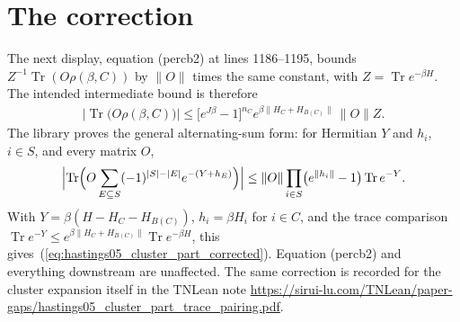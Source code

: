\documentclass{article}
\begin{document}
\section{The correction}
The next display, equation (percb2) at lines 1186--1195, bounds
$Z^{-1}\operatorname{Tr}(O\rho(\beta,C))$ by $\|O\|$ times the same constant,
with $Z=\operatorname{Tr}e^{-\beta H}$. The intended intermediate bound is
therefore
\begin{align}
 \bigl|\operatorname{Tr}\bigl(O\rho(\beta,C)\bigr)\bigr|
 \le\bigl[e^{J\beta}-1\bigr]^{n_C}e^{\beta\|H_C+H_{B(C)}\|}\,\|O\|Z.
 \label{eq:hastings05_cluster_part_corrected}
\end{align}
The library proves the general alternating-sum form: for Hermitian $Y$ and
$h_i$, $i\in S$, and every matrix $O$,
\begin{align*}
 \Bigl|\operatorname{Tr}\Bigl(O\sum_{E\subseteq S}(-1)^{|S|-|E|}
 e^{-(Y+h_E)}\Bigr)\Bigr|
 \le\|O\|\prod_{i\in S}\bigl(e^{\|h_i\|}-1\bigr)\operatorname{Tr}e^{-Y}.
\end{align*}
With $Y=\beta(H-H_C-H_{B(C)})$, $h_i=\beta H_i$ for $i\in C$, and the
trace comparison $\operatorname{Tr}e^{-Y}\le
e^{\beta\|H_C+H_{B(C)}\|}\operatorname{Tr}e^{-\beta H}$, this
gives~(\ref{eq:hastings05_cluster_part_corrected}). Equation (percb2) and
everything downstream are unaffected. The same correction is recorded for the
cluster expansion itself in the TNLean note
\url{https://sirui-lu.com/TNLean/paper-gaps/hastings05_cluster_part_trace_pairing.pdf}.


\end{document}
